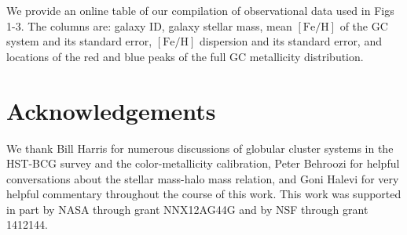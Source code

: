 \documentclass[fleqn,usenatbib]{mnras}
\newcommand{\feh}{\mathrm{[Fe/H]}}
\begin{document}
We provide an online table of our compilation of observational data used in Figs 1-3. The columns are: galaxy ID, galaxy stellar mass, mean $\feh$ of the GC system and its standard error, $\feh$ dispersion and its standard error, and locations of the red and blue peaks of the full GC metallicity distribution.

\section*{Acknowledgements}

We thank Bill Harris for numerous discussions of globular cluster systems in the HST-BCG survey and the color-metallicity calibration, Peter Behroozi for helpful conversations about the stellar mass-halo mass relation, and Goni Halevi for very helpful commentary throughout the course of this work. This work was supported in part by NASA through grant NNX12AG44G and by NSF through grant 1412144.





 






\bsp	%
\label{lastpage}
\end{document}
